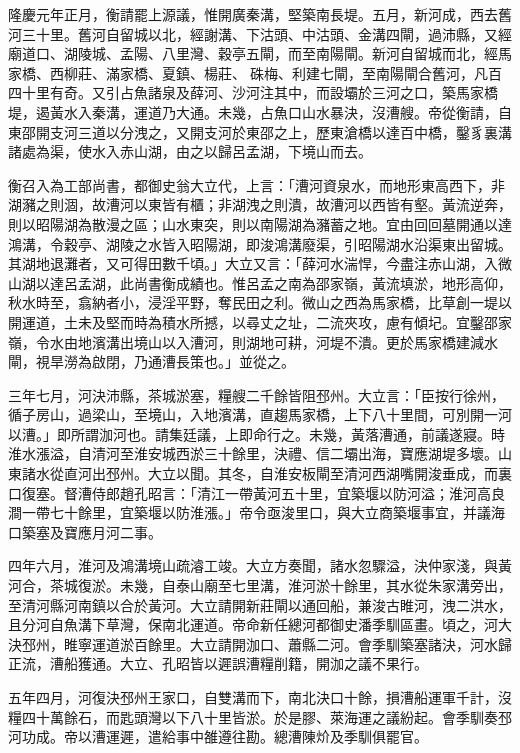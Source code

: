 隆慶元年正月，衡請罷上源議，惟開廣秦溝，堅築南長堤。五月，新河成，西去舊河三十里。舊河自留城以北，經謝溝、下沽頭、中沽頭、金溝四閘，過沛縣，又經廟道口、湖陵城、孟陽、八里灣、穀亭五閘，而至南陽閘。新河自留城而北，經馬家橋、西柳莊、滿家橋、夏鎮、楊莊、硃梅、利建七閘，至南陽閘合舊河，凡百四十里有奇。又引占魚諸泉及薛河、沙河注其中，而設壩於三河之口，築馬家橋堤，遏黃水入秦溝，運道乃大通。未幾，占魚口山水暴決，沒漕艘。帝從衡請，自東邵開支河三道以分洩之，又開支河於東邵之上，歷東滄橋以達百中橋，鑿豸裏溝諸處為渠，使水入赤山湖，由之以歸呂孟湖，下境山而去。

衡召入為工部尚書，都御史翁大立代，上言：「漕河資泉水，而地形東高西下，非湖瀦之則涸，故漕河以東皆有櫃；非湖洩之則潰，故漕河以西皆有壑。黃流逆奔，則以昭陽湖為散漫之區；山水東突，則以南陽湖為瀦蓄之地。宜由回回墓開通以達鴻溝，令穀亭、湖陵之水皆入昭陽湖，即浚鴻溝廢渠，引昭陽湖水沿渠東出留城。其湖地退灘者，又可得田數千頃。」大立又言：「薛河水湍悍，今盡注赤山湖，入微山湖以達呂孟湖，此尚書衡成績也。惟呂孟之南為邵家嶺，黃流填淤，地形高仰，秋水時至，翕納者小，浸淫平野，奪民田之利。微山之西為馬家橋，比草創一堤以開運道，土未及堅而時為積水所撼，以尋丈之址，二流夾攻，慮有傾圮。宜鑿邵家嶺，令水由地濱溝出境山以入漕河，則湖地可耕，河堤不潰。更於馬家橋建減水閘，視旱澇為啟閉，乃通漕長策也。」並從之。

三年七月，河決沛縣，茶城淤塞，糧艘二千餘皆阻邳州。大立言：「臣按行徐州，循子房山，過梁山，至境山，入地濱溝，直趨馬家橋，上下八十里間，可別開一河以漕。」即所謂泇河也。請集廷議，上即命行之。未幾，黃落漕通，前議遂寢。時淮水漲溢，自清河至淮安城西淤三十餘里，決禮、信二壩出海，寶應湖堤多壞。山東諸水從直河出邳州。大立以聞。其冬，自淮安板閘至清河西湖嘴開浚垂成，而裏口復塞。督漕侍郎趙孔昭言：「清江一帶黃河五十里，宜築堰以防河溢；淮河高良澗一帶七十餘里，宜築堰以防淮漲。」帝令亟浚里口，與大立商築堰事宜，并議海口築塞及寶應月河二事。

四年六月，淮河及鴻溝境山疏濬工竣。大立方奏聞，諸水忽驟溢，決仲家淺，與黃河合，茶城復淤。未幾，自泰山廟至七里溝，淮河淤十餘里，其水從朱家溝旁出，至清河縣河南鎮以合於黃河。大立請開新莊閘以通回船，兼浚古睢河，洩二洪水，且分河自魚溝下草灣，保南北運道。帝命新任總河都御史潘季馴區畫。頃之，河大決邳州，睢寧運道淤百餘里。大立請開泇口、蕭縣二河。會季馴築塞諸決，河水歸正流，漕船獲通。大立、孔昭皆以遲誤漕糧削籍，開泇之議不果行。

五年四月，河復決邳州王家口，自雙溝而下，南北決口十餘，損漕船運軍千計，沒糧四十萬餘石，而匙頭灣以下八十里皆淤。於是膠、萊海運之議紛起。會季馴奏邳河功成。帝以漕運遲，遣給事中雒遵往勘。總漕陳炌及季馴俱罷官。

